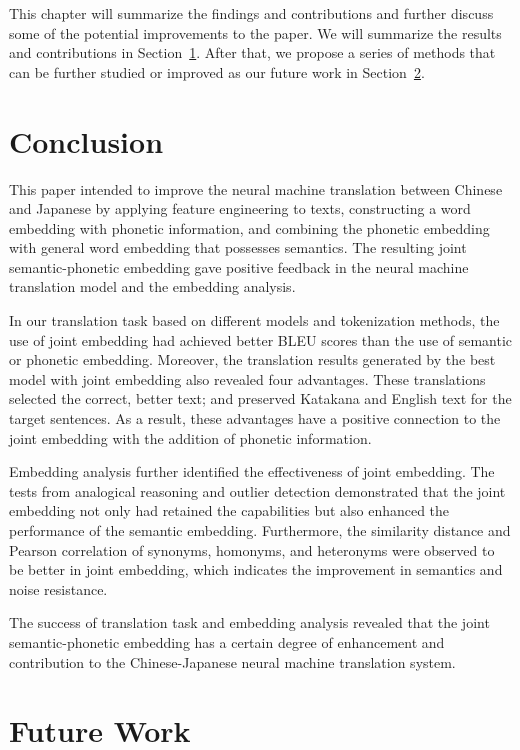 \hspace{24pt}

This chapter will summarize the findings and contributions and further discuss some of the potential improvements to the paper. We will summarize the results and contributions in Section~\ref{sec:conclusion}. After that, we propose a series of methods that can be further studied or improved as our future work in Section~\ref{sec:future_work}.

\section{Conclusion} \label{sec:conclusion}

This paper intended to improve the neural machine translation between Chinese and Japanese by applying feature engineering to texts, constructing a word embedding with phonetic information, and combining the phonetic embedding with general word embedding that possesses semantics. The resulting joint semantic-phonetic embedding gave positive feedback in the neural machine translation model and the embedding analysis. 

In our translation task based on different models and tokenization methods, the use of joint embedding had achieved better BLEU scores than the use of semantic or phonetic embedding. Moreover, the translation results generated by the best model with joint embedding also revealed four advantages. These translations selected the correct, better text; and preserved Katakana and English text for the target sentences. As a result, these advantages have a positive connection to the joint embedding with the addition of phonetic information.

Embedding analysis further identified the effectiveness of joint embedding. The tests from analogical reasoning and outlier detection demonstrated that the joint embedding not only had retained the capabilities but also enhanced the performance of the semantic embedding. Furthermore, the similarity distance and Pearson correlation of synonyms, homonyms, and heteronyms were observed to be better in joint embedding, which indicates the improvement in semantics and noise resistance.

The success of translation task and embedding analysis revealed that the joint semantic-phonetic embedding has a certain degree of enhancement and contribution to the Chinese-Japanese neural machine translation system.

\section{Future Work} \label{sec:future_work}


